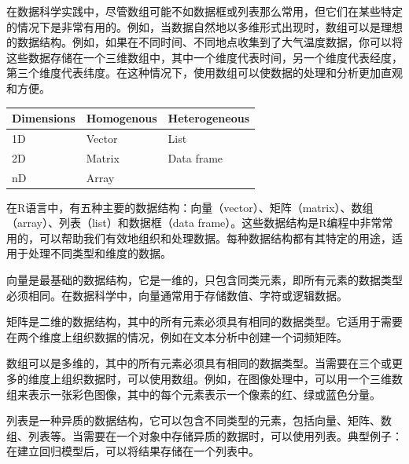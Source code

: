 \documentclass[]{book}
\newenvironment{Shaded}{\begin{snugshade}}{\end{snugshade}}
\newcommand{\CommentTok}[1]{\textcolor[rgb]{0.56,0.35,0.01}{\textit{#1}}}
\newcommand{\DataTypeTok}[1]{\textcolor[rgb]{0.13,0.29,0.53}{#1}}
\newcommand{\KeywordTok}[1]{\textcolor[rgb]{0.13,0.29,0.53}{\textbf{#1}}}
\newcommand{\NormalTok}[1]{#1}
\newcommand{\OperatorTok}[1]{\textcolor[rgb]{0.81,0.36,0.00}{\textbf{#1}}}
\newcommand{\StringTok}[1]{\textcolor[rgb]{0.31,0.60,0.02}{#1}}
\begin{document}
在数据科学实践中，尽管数组可能不如数据框或列表那么常用，但它们在某些特定的情况下是非常有用的。例如，当数据自然地以多维形式出现时，数组可以是理想的数据结构。例如，如果在不同时间、不同地点收集到了大气温度数据，你可以将这些数据存储在一个三维数组中，其中一个维度代表时间，另一个维度代表经度，第三个维度代表纬度。在这种情况下，使用数组可以使数据的处理和分析更加直观和方便。

\begin{longtable}[]{@{}lll@{}}
\toprule
Dimensions & Homogenous & Heterogeneous\tabularnewline
\midrule
\endhead
1D & Vector & List\tabularnewline
2D & Matrix & Data frame\tabularnewline
nD & Array &\tabularnewline
\bottomrule
\end{longtable}

在R语言中，有五种主要的数据结构：向量（vector）、矩阵（matrix）、数组（array）、列表（list）和数据框（data frame）。这些数据结构是R编程中非常常用的，可以帮助我们有效地组织和处理数据。每种数据结构都有其特定的用途，适用于处理不同类型和维度的数据。

向量是最基础的数据结构，它是一维的，只包含同类元素，即所有元素的数据类型必须相同。在数据科学中，向量通常用于存储数值、字符或逻辑数据。

矩阵是二维的数据结构，其中的所有元素必须具有相同的数据类型。它适用于需要在两个维度上组织数据的情况，例如在文本分析中创建一个词频矩阵。

数组可以是多维的，其中的所有元素必须具有相同的数据类型。当需要在三个或更多的维度上组织数据时，可以使用数组。例如，在图像处理中，可以用一个三维数组来表示一张彩色图像，其中的每个元素表示一个像素的红、绿或蓝色分量。

列表是一种异质的数据结构，它可以包含不同类型的元素，包括向量、矩阵、数组、列表等。当需要在一个对象中存储异质的数据时，可以使用列表。典型例子：在建立回归模型后，可以将结果存储在一个列表中。

\begin{Shaded}
\end{Shaded}
\end{document}
